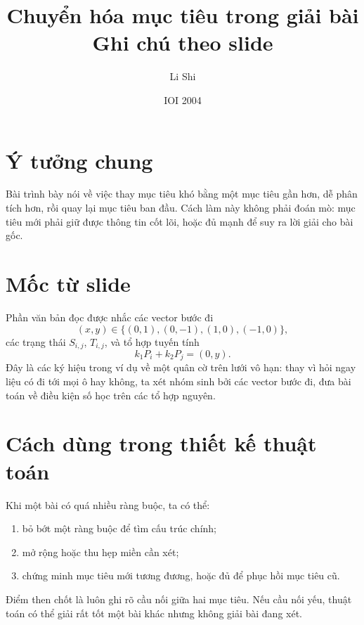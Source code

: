 \documentclass[11pt]{article}
\title{Chuyển hóa mục tiêu trong giải bài\\{\large Ghi chú theo slide}}
\author{Li Shi}
\date{IOI 2004}
\begin{document}
\maketitle


\section{Ý tưởng chung}

Bài trình bày nói về việc thay mục tiêu khó bằng một mục tiêu gần hơn, dễ
phân tích hơn, rồi quay lại mục tiêu ban đầu. Cách làm này không phải đoán
mò: mục tiêu mới phải giữ được thông tin cốt lõi, hoặc đủ mạnh để suy ra lời
giải cho bài gốc.

\section{Mốc từ slide}

Phần văn bản đọc được nhắc các vector bước đi
\[
  (x,y)\in\{(0,1),(0,-1),(1,0),(-1,0)\},
\]
các trạng thái \(S_{i,j}\), \(T_{i,j}\), và tổ hợp tuyến tính
\[
  k_1P_i+k_2P_j=(0,y).
\]
Đây là các ký hiệu trong ví dụ về một quân cờ trên lưới vô hạn: thay vì hỏi
ngay liệu có đi tới mọi ô hay không, ta xét nhóm sinh bởi các vector bước đi,
đưa bài toán về điều kiện số học trên các tổ hợp nguyên.

\section{Cách dùng trong thiết kế thuật toán}

Khi một bài có quá nhiều ràng buộc, ta có thể:
\begin{enumerate}
  \item bỏ bớt một ràng buộc để tìm cấu trúc chính;
  \item mở rộng hoặc thu hẹp miền cần xét;
  \item chứng minh mục tiêu mới tương đương, hoặc đủ để phục hồi mục tiêu cũ.
\end{enumerate}
Điểm then chốt là luôn ghi rõ cầu nối giữa hai mục tiêu. Nếu cầu nối yếu,
thuật toán có thể giải rất tốt một bài khác nhưng không giải bài đang xét.
\end{document}
